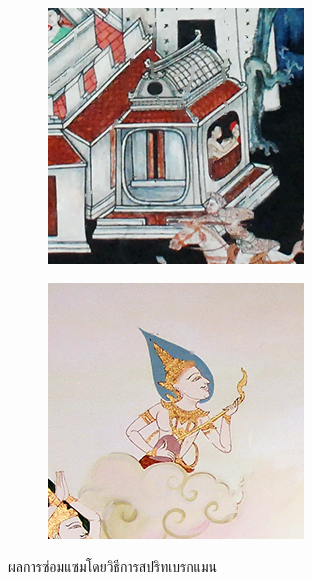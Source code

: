 \begin{figure}[H]
\begin{subfigure}{\ResultSubFigureWidth \linewidth}
    \end{subfigure}
    \begin{subfigure}{\ResultSubFigureWidth \linewidth}
        \centering
        \includegraphics[width=\ResultSubFigurePadding \linewidth]{image/result_ex4/splitbergman_case04.png}			
    \end{subfigure}
    \begin{subfigure}{\ResultSubFigureWidth \linewidth}
        \centering
        \includegraphics[width=\ResultSubFigurePadding \linewidth]{image/result_ex4/splitbergman_case05.png}			
    \end{subfigure}
    \caption{ผลการซ่อมแซมโดยวิธีการสปริทเบรกแมน}
\end{figure}